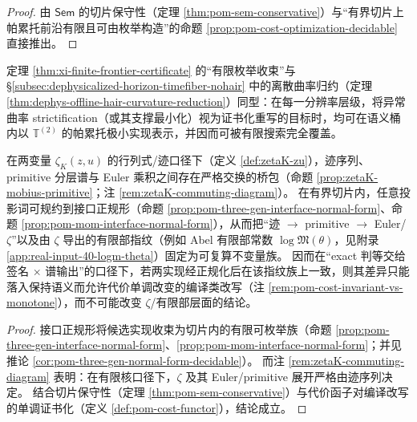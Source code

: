 \begin{proof}
由 \(\mathsf{Sem}\) 的切片保守性（定理 \ref{thm:pom-sem-conservative}）与“有界切片上帕累托前沿有限且可由枚举构造”的命题 \ref{prop:pom-cost-optimization-decidable} 直接推出。
\end{proof}

定理 \ref{thm:xi-finite-frontier-certificate} 的“有限枚举收束”与 \S\ref{subsec:dephysicalized-horizon-timefiber-nohair} 中的离散曲率归约（定理 \ref{thm:dephys-offline-hair-curvature-reduction}）同型：在每一分辨率层级，将异常曲率 strictification（或其支撑最小化）视为证书化重写的目标时，均可在语义桶内以 \(\mathbb{T}^{(2)}\) 的帕累托极小实现表示，并因而可被有限搜索完全覆盖。

\begin{theorem}\label{thm:xi-zeta-interface-auditable-uniqueness}
在两变量 \(\zeta_K(z,u)\) 的行列式/迹口径下（定义 \ref{def:zetaK-zu}），迹序列、primitive 分层谱与 Euler 乘积之间存在严格交换的桥包（命题 \ref{prop:zetaK-mobius-primitive}；注 \ref{rem:zetaK-commuting-diagram}）。
在有界切片内，任意投影词可规约到接口正规形（命题 \ref{prop:pom-three-gen-interface-normal-form}、命题 \ref{prop:pom-mom-interface-normal-form}），从而把“迹 \(\to\) primitive \(\to\) Euler/\(\zeta\)”以及由 \(\zeta\) 导出的有限部指纹（例如 Abel 有限部常数 \(\log\mathfrak{M}(\theta)\)，见附录 \ref{app:real-input-40-logm-theta}）固定为可复算不变量族。
因而在“exact 判等交给签名 \(\times\) 谱输出”的口径下，若两实现经正规化后在该指纹族上一致，则其差异只能落入保持语义而允许代价单调改变的编译类改写（注 \ref{rem:pom-cost-invariant-vs-monotone}），而不可能改变 \(\zeta\)/有限部层面的结论。
\end{theorem}

\begin{proof}
接口正规形将候选实现收束为切片内的有限可枚举族（命题 \ref{prop:pom-three-gen-interface-normal-form}、\ref{prop:pom-mom-interface-normal-form}；并见推论 \ref{cor:pom-three-gen-normal-form-decidable}）。
而注 \ref{rem:zetaK-commuting-diagram} 表明：在有限核口径下，\(\zeta\) 及其 Euler/primitive 展开严格由迹序列决定。
结合切片保守性（定理 \ref{thm:pom-sem-conservative}）与代价函子对编译改写的单调证书化（定义 \ref{def:pom-cost-functor}），结论成立。
\end{proof}

